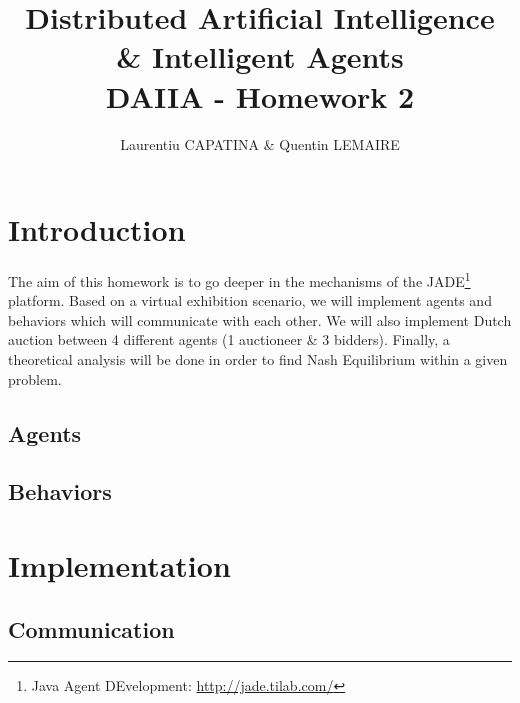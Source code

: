 \documentclass[a4paper,11pt]{article}
\title{Distributed Artificial Intelligence \& Intelligent Agents \\ DAIIA - Homework 2}
\author{Laurentiu CAPATINA \& Quentin LEMAIRE}
\begin{document}
  \maketitle %

  \section{Introduction}
  
  The aim of this homework is to go deeper in the mechanisms of the JADE\footnote{Java Agent DEvelopment: \href{http://jade.tilab.com/}{http://jade.tilab.com/}} 
  platform. 
  Based on a virtual exhibition scenario, we will implement agents and behaviors which will communicate with each other. We will also implement Dutch auction 
  between 4 different agents (1 auctioneer \& 3 bidders). Finally, a theoretical analysis will be done in order to find Nash Equilibrium within a given problem.
  
  \subsection{Agents}


  \subsection{Behaviors}
 

  \newcommand{\pa}{\textit{Profiler Agent}}
  \newcommand{\cu}{\textit{Curator Agent}}
  \renewcommand{\to}{\textit{Tour Guide Agent}}
  \newcommand{\am}{\textit{Artist Manager Agent}}
  
  \section{Implementation}
  
  \subsection{Communication}
\end{document}
